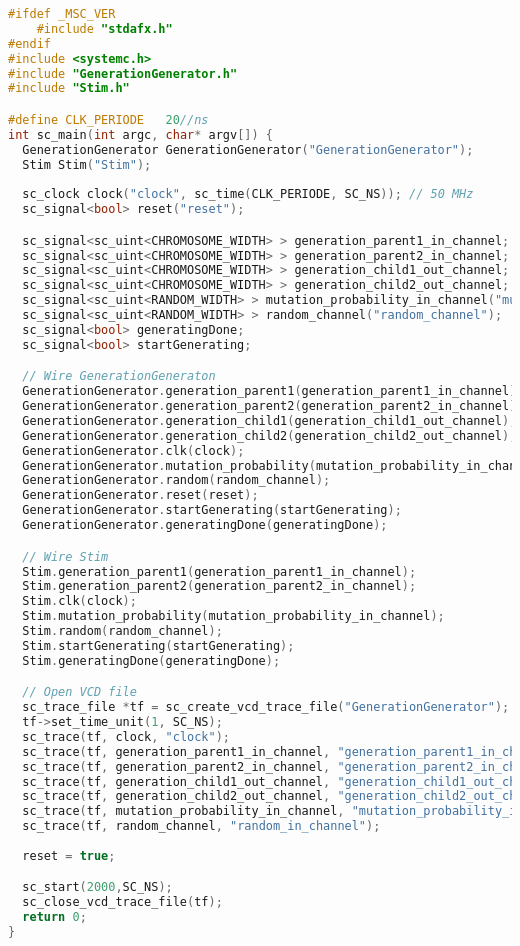 \begin{lstlisting}[language=C++,caption={Testbench for GenerationGenerator},label={lst:generatorTestbench}]
#ifdef _MSC_VER
	#include "stdafx.h"
#endif
#include <systemc.h>
#include "GenerationGenerator.h"
#include "Stim.h"

#define CLK_PERIODE   20//ns
int sc_main(int argc, char* argv[]) {
  GenerationGenerator GenerationGenerator("GenerationGenerator");
  Stim Stim("Stim");
  
  sc_clock clock("clock", sc_time(CLK_PERIODE, SC_NS)); // 50 MHz
  sc_signal<bool> reset("reset");

  sc_signal<sc_uint<CHROMOSOME_WIDTH> > generation_parent1_in_channel;
  sc_signal<sc_uint<CHROMOSOME_WIDTH> > generation_parent2_in_channel;
  sc_signal<sc_uint<CHROMOSOME_WIDTH> > generation_child1_out_channel;
  sc_signal<sc_uint<CHROMOSOME_WIDTH> > generation_child2_out_channel;
  sc_signal<sc_uint<RANDOM_WIDTH> > mutation_probability_in_channel("mutation_probability_in_channel");
  sc_signal<sc_uint<RANDOM_WIDTH> > random_channel("random_channel");
  sc_signal<bool> generatingDone;
  sc_signal<bool> startGenerating;

  // Wire GenerationGeneraton
  GenerationGenerator.generation_parent1(generation_parent1_in_channel);
  GenerationGenerator.generation_parent2(generation_parent2_in_channel);
  GenerationGenerator.generation_child1(generation_child1_out_channel);
  GenerationGenerator.generation_child2(generation_child2_out_channel);
  GenerationGenerator.clk(clock);
  GenerationGenerator.mutation_probability(mutation_probability_in_channel);
  GenerationGenerator.random(random_channel);
  GenerationGenerator.reset(reset);
  GenerationGenerator.startGenerating(startGenerating);
  GenerationGenerator.generatingDone(generatingDone);

  // Wire Stim
  Stim.generation_parent1(generation_parent1_in_channel);
  Stim.generation_parent2(generation_parent2_in_channel);
  Stim.clk(clock);
  Stim.mutation_probability(mutation_probability_in_channel);
  Stim.random(random_channel);
  Stim.startGenerating(startGenerating);
  Stim.generatingDone(generatingDone);

  // Open VCD file
  sc_trace_file *tf = sc_create_vcd_trace_file("GenerationGenerator");
  tf->set_time_unit(1, SC_NS);
  sc_trace(tf, clock, "clock");
  sc_trace(tf, generation_parent1_in_channel, "generation_parent1_in_channel");
  sc_trace(tf, generation_parent2_in_channel, "generation_parent2_in_channel");
  sc_trace(tf, generation_child1_out_channel, "generation_child1_out_channel");
  sc_trace(tf, generation_child2_out_channel, "generation_child2_out_channel");
  sc_trace(tf, mutation_probability_in_channel, "mutation_probability_in_channel");
  sc_trace(tf, random_channel, "random_in_channel");
  
  reset = true;

  sc_start(2000,SC_NS);
  sc_close_vcd_trace_file(tf);
  return 0;
}
\end{lstlisting}

